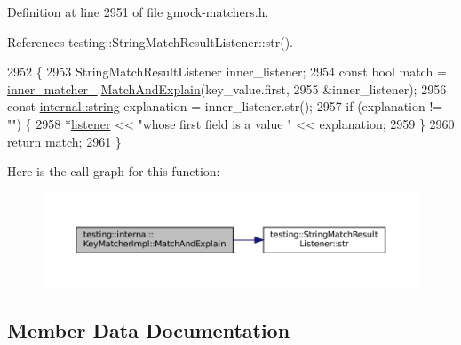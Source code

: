 Definition at line 2951 of file gmock-\/matchers.\+h.



References testing\+::\+String\+Match\+Result\+Listener\+::str().


\begin{DoxyCode}
2952                                                                     \{
2953     StringMatchResultListener inner\_listener;
2954     \textcolor{keyword}{const} \textcolor{keywordtype}{bool} match = \hyperlink{classtesting_1_1internal_1_1KeyMatcherImpl_a7b81235a36e13af4d4be7d08f07ba286}{inner\_matcher\_}.\hyperlink{classtesting_1_1internal_1_1MatcherBase_a08429a6d7e7d330de4a4eb4e272105a7}{MatchAndExplain}(key\_value.first,
2955                                                       &inner\_listener);
2956     \textcolor{keyword}{const} \hyperlink{namespacetesting_1_1internal_a8e8ff5b11e64078831112677156cb111}{internal::string} explanation = inner\_listener.str();
2957     \textcolor{keywordflow}{if} (explanation != \textcolor{stringliteral}{""}) \{
2958       *\hyperlink{namespaceinteractive__marker_a0e579ab555212bb5e2c9f8a675b7618a}{listener} << \textcolor{stringliteral}{"whose first field is a value "} << explanation;
2959     \}
2960     \textcolor{keywordflow}{return} match;
2961   \}
\end{DoxyCode}
Here is the call graph for this function\+:
\nopagebreak
\begin{figure}[H]
\begin{center}
\leavevmode
\includegraphics[width=350pt]{classtesting_1_1internal_1_1KeyMatcherImpl_ae821c96473c6400defbb21eb9eca8d4c_cgraph}
\end{center}
\end{figure}


\subsection{Member Data Documentation}
\mbox{\label{classtesting_1_1internal_1_1KeyMatcherImpl_a7b81235a36e13af4d4be7d08f07ba286}} 
